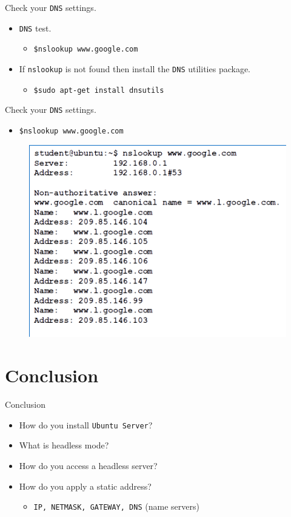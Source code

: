 \documentclass{beamer}
\begin{document}
\begin{frame}{Check your \texttt{DNS} settings.}
  \begin{itemize}
    \item \texttt{DNS} test.
    \begin{itemize}
      \item \texttt{\$nslookup www.google.com}
    \end{itemize}
    \item If \texttt{nslookup} is not found then install the \texttt{DNS} utilities package.
    \begin{itemize}
      \item \texttt{\$sudo apt-get install dnsutils}
    \end{itemize}
  \end{itemize}
\end{frame}

\begin{frame}{Check your \texttt{DNS} settings.}
  \begin{itemize}
    \item \texttt{\$nslookup www.google.com}
  \end{itemize}
  \begin{figure}
    \begin{center}
      \includegraphics[width=0.8\linewidth]{nslookup.png}
    \end{center}
  \end{figure}
\end{frame}


\section*{Conclusion}
\begin{frame}{Conclusion}
  \begin{itemize}
    \item How do you install \texttt{Ubuntu Server}?
    \item What is headless mode?
    \item How do you access a headless server?
    \item How do you apply a static address?
    \begin{itemize}
      \item \texttt{IP, NETMASK, GATEWAY, DNS} (name servers)
    \end{itemize}
  \end{itemize}
\end{frame}
\end{document}

